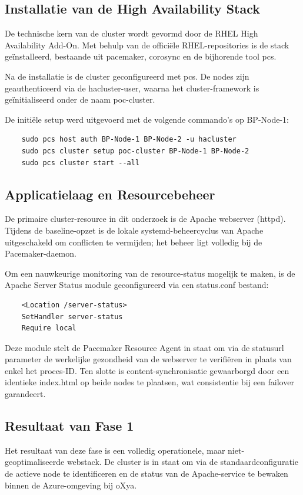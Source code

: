 \subsection{Installatie van de High Availability Stack}
De technische kern van de cluster wordt gevormd door de RHEL High Availability Add-On. Met behulp van de officiële RHEL-repositories is de stack geïnstalleerd, bestaande uit pacemaker, corosync en de bijhorende tool pcs.
\medskip

Na de installatie is de cluster geconfigureerd met pcs. De nodes zijn geauthenticeerd via de hacluster-user, waarna het cluster-framework is geïnitialiseerd onder de naam poc-cluster.
\medskip

De initiële setup werd uitgevoerd met de volgende commando's op BP-Node-1:
\begin{verbatim}
    sudo pcs host auth BP-Node-1 BP-Node-2 -u hacluster
    sudo pcs cluster setup poc-cluster BP-Node-1 BP-Node-2
    sudo pcs cluster start --all
\end{verbatim}

\subsection{Applicatielaag en Resourcebeheer}
De primaire cluster-resource in dit onderzoek is de Apache webserver (httpd). Tijdens de baseline-opzet is de lokale systemd-beheercyclus van Apache uitgeschakeld om conflicten te vermijden; het beheer ligt volledig bij de Pacemaker-daemon.

Om een nauwkeurige monitoring van de resource-status mogelijk te maken, is de Apache Server Status module geconfigureerd via een status.conf bestand:

\begin{verbatim}
    <Location /server-status>
    SetHandler server-status
    Require local
\end{verbatim}

Deze module stelt de Pacemaker Resource Agent in staat om via de statusurl parameter de werkelijke gezondheid van de webserver te verifiëren in plaats van enkel het proces-ID. Ten slotte is content-synchronisatie gewaarborgd door een identieke index.html op beide nodes te plaatsen, wat consistentie bij een failover garandeert.

\subsection{Resultaat van Fase 1}
Het resultaat van deze fase is een volledig operationele, maar niet-geoptimaliseerde webstack. De cluster is in staat om via de standaardconfiguratie de actieve node te identificeren en de status van de Apache-service te bewaken binnen de Azure-omgeving bij oXya.

